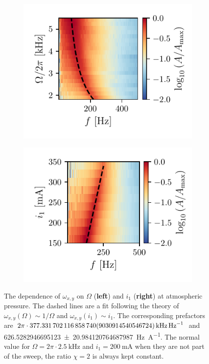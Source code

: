 \begin{figure}
    \centering
    \begin{subfigure}{0.5\textwidth}
        \includegraphics{figures/data/xy_mode_dependence_on_driving_frequency.pdf}
    \end{subfigure}%
    \begin{subfigure}{0.5\textwidth}
        \includegraphics{figures/data/xy_mode_dependence_on_inner_current.pdf}
    \end{subfigure}
    \caption{The dependence of $\omega_{x,y}$ on $\Omega$ (\textbf{left}) and $i_1$ (\textbf{right}) at atmospheric pressure. The dashed lines are a fit following the theory of $\omega_{x,y}(\Omega) \sim 1 / \Omega$ and $\omega_{x,y}(i_1) \sim i_1$. The corresponding prefactors are $2\pi \cdot \qty{377.33170211685874\pm9.030914540546724}{\kilo\hertz\per\hertz}$ and \qty{626.5282946695123\pm20.984120764687987}{\hertz\per\ampere}. The normal value for $\Omega = 2\pi \cdot \qty{2.5}{\kilo\hertz}$ and $i_1 = \qty{200}{\milli\ampere}$ when they are not part of the sweep, the ratio $\chi = 2$ is always kept constant.}
    \label{fig:xy-mode-dependence-1bar}
\end{figure}


